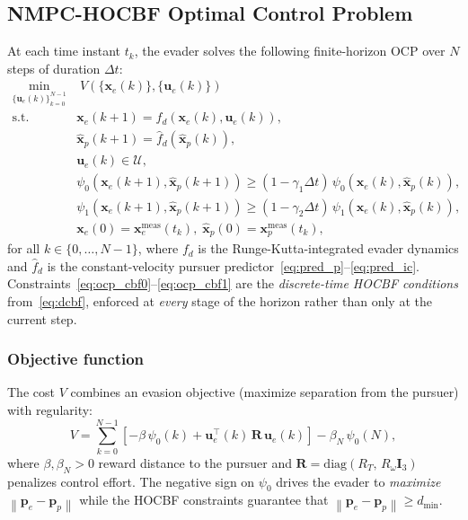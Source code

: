 \documentclass[lettersize,journal]{IEEEtran}
\theoremstyle{definition}
\theoremstyle{remark}
\newcommand{\norm}[1]{\left\| #1 \right\|}
\newcommand{\vect}[1]{\bm{#1}}
\newcommand{\mat}[1]{\mathbf{#1}}
\begin{document}
\subsection{NMPC-HOCBF Optimal Control Problem}
\label{sec:ocp}

At each time instant $t_k$, the evader solves the following
finite-horizon OCP over $N$ steps of duration $\Delta t$:
\begin{subequations}
\label{eq:ocp}
\begin{align}
    \min_{\{\vect{u}_e(k)\}_{k=0}^{N-1}}
        &\;V\!\left(\{\vect{x}_e(k)\},\{\vect{u}_e(k)\}\right)
        \label{eq:ocp_obj} \\
    \text{s.t.}\quad
    &\vect{x}_e(k+1) = f_d\!\left(\vect{x}_e(k),\vect{u}_e(k)\right),
        \label{eq:ocp_dyn} \\
    &\hat{\vect{x}}_p(k+1) = \hat{f}_d\!\left(\hat{\vect{x}}_p(k)\right),
        \label{eq:ocp_pred} \\
    &\vect{u}_e(k)\in\mathcal{U},
        \label{eq:ocp_input} \\
    &\psi_0\!\left(\vect{x}_e(k+1),\hat{\vect{x}}_p(k+1)\right)
        \geq (1-\gamma_1\Delta t)\,
        \psi_0\!\left(\vect{x}_e(k),\hat{\vect{x}}_p(k)\right),
        \label{eq:ocp_cbf0} \\
    &\psi_1\!\left(\vect{x}_e(k+1),\hat{\vect{x}}_p(k+1)\right)
        \geq (1-\gamma_2\Delta t)\,
        \psi_1\!\left(\vect{x}_e(k),\hat{\vect{x}}_p(k)\right),
        \label{eq:ocp_cbf1} \\
    &\vect{x}_e(0) = \vect{x}_e^{\mathrm{meas}}(t_k),\;
     \hat{\vect{x}}_p(0) = \vect{x}_p^{\mathrm{meas}}(t_k),
        \label{eq:ocp_ic}
\end{align}
\end{subequations}
for all $k\in\{0,\ldots,N-1\}$, where
$f_d$ is the Runge-Kutta-integrated evader dynamics and
$\hat{f}_d$ is the constant-velocity pursuer
predictor~\eqref{eq:pred_p}--\eqref{eq:pred_ic}.
Constraints~\eqref{eq:ocp_cbf0}--\eqref{eq:ocp_cbf1} are the
\emph{discrete-time HOCBF conditions} from~\eqref{eq:dcbf}, enforced
at \emph{every} stage of the horizon rather than only at the current step.

\subsubsection*{Objective function}
The cost $V$ combines an evasion objective (maximize separation from
the pursuer) with regularity:
\begin{equation}
    V = \sum_{k=0}^{N-1}\!\left[
        -\beta\,\psi_0(k)
        + \vect{u}_e^\top(k)\,\mat{R}\,\vect{u}_e(k)
    \right]
    - \beta_N\,\psi_0(N),
    \label{eq:cost}
\end{equation}
where $\beta,\beta_N > 0$ reward distance to the pursuer and
$\mat{R} = \mathrm{diag}(R_T,\,R_\omega\mat{I}_3)$ penalizes
control effort.
The negative sign on $\psi_0$ drives the evader to \emph{maximize}
$\norm{\vect{p}_e - \vect{p}_p}$ while the HOCBF constraints
guarantee that $\norm{\vect{p}_e - \vect{p}_p} \geq d_{\min}$.
\end{document}
